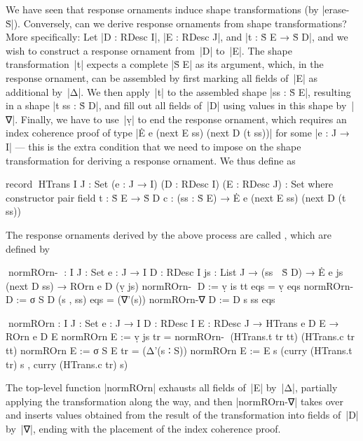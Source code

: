 We have seen that response ornaments induce shape transformations (by |erase-Ṡ|).
Conversely, can we derive response ornaments from shape transformations?
More specifically: Let |D : RDesc I|, |E : RDesc J|, and |t : Ṡ E → Ṡ D|, and we wish to construct a response ornament from~|D| to~|E|.
The shape transformation~|t| expects a complete |Ṡ E| as its argument, which, in the response ornament, can be assembled by first marking all fields of~|E| as additional by~|Δ|.
We then apply~|t| to the assembled shape |ss : Ṡ E|, resulting in a shape |t ss : Ṡ D|, and fill out all fields of~|D| using values in this shape by~|∇|.
Finally, we have to use~|ṿ| to end the response ornament, which requires an index coherence proof of type |Ė e (next E ss) (next D (t ss))| for some |e : J → I| --- this is the extra condition that we need to impose on the shape transformation for deriving a response ornament.
We thus define  as
\begin{code}
record ^^^HTrans {I J : Set} (e : J → I) (D : RDesc I) (E : RDesc J) : Set
  where
    constructor pair
    field
      t  : Ṡ E → Ṡ D
      c  : (ss : Ṡ E) → Ė e (next E ss) (next D (t ss))
\end{code}
The response ornaments derived by the above process are called , which are defined by
\begin{code}
^^^normROrn-∇ :  {I J : Set} {e : J → I} {D : RDesc I} {js : List J} →
                 (ss ∶ Ṡ D) → Ė e js (next D ss) → ROrn e D (ṿ js)
normROrn-∇ {D := ṿ is   } tt        eqs = ṿ eqs
normROrn-∇ {D := σ S D  } (s , ss)  eqs = (∇'(s)) normROrn-∇ {D := D s} ss eqs

^^^normROrn :  {I J : Set} {e : J → I} {D : RDesc I} {E : RDesc J} →
               HTrans e D E → ROrn e D E
normROrn {E := ṿ js   } tr = normROrn-∇ (HTrans.t tr tt) (HTrans.c tr tt)
normROrn {E := σ S E  } tr =
  (Δ'(s ∶ S)) normROrn {E := E s} (curry (HTrans.t tr) s , curry (HTrans.c tr) s)
\end{code}
The top-level function |normROrn| exhausts all fields of~|E| by~|Δ|, partially applying the transformation along the way, and then |normROrn-∇| takes over and inserts values obtained from the result of the transformation into fields of~|D| by~|∇|, ending with the placement of the index coherence proof.

